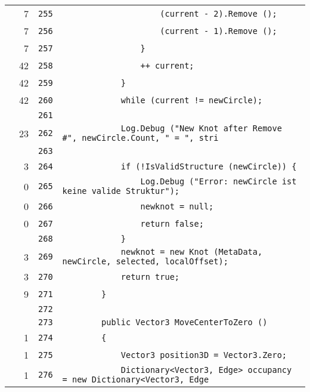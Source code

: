 \documentclass[a4paper,10pt]{article}
\begin{document}
\begin{longtable}[l]{lrrl}
\cellcolor{green} & 7 & \verb~255~ & \verb~                    (current - 2).Remove ();~\\
\cellcolor{green} & 7 & \verb~256~ & \verb~                    (current - 1).Remove ();~\\
\cellcolor{green} & 7 & \verb~257~ & \verb~                }~\\
\cellcolor{green} & 42 & \verb~258~ & \verb~                ++ current;~\\
\cellcolor{green} & 42 & \verb~259~ & \verb~            }~\\
\cellcolor{green} & 42 & \verb~260~ & \verb~            while (current != newCircle);~\\
\cellcolor{gray} &  & \verb~261~ & \verb~~\\
\cellcolor{green} & 23 & \verb~262~ & \verb~            Log.Debug ("New Knot after Remove #", newCircle.Count, " = ", stri~\\
\cellcolor{gray} &  & \verb~263~ & \verb~~\\
\cellcolor{green} & 3 & \verb~264~ & \verb~            if (!IsValidStructure (newCircle)) {~\\
\cellcolor{red} & 0 & \verb~265~ & \verb~                Log.Debug ("Error: newCircle ist keine valide Struktur");~\\
\cellcolor{red} & 0 & \verb~266~ & \verb~                newknot = null;~\\
\cellcolor{red} & 0 & \verb~267~ & \verb~                return false;~\\
\cellcolor{gray} &  & \verb~268~ & \verb~            }~\\
\cellcolor{green} & 3 & \verb~269~ & \verb~            newknot = new Knot (MetaData, newCircle, selected, localOffset);~\\
\cellcolor{green} & 3 & \verb~270~ & \verb~            return true;~\\
\cellcolor{green} & 9 & \verb~271~ & \verb~        }~\\
\cellcolor{gray} &  & \verb~272~ & \verb~~\\
\cellcolor{gray} &  & \verb~273~ & \verb~        public Vector3 MoveCenterToZero ()~\\
\cellcolor{green} & 1 & \verb~274~ & \verb~        {~\\
\cellcolor{green} & 1 & \verb~275~ & \verb~            Vector3 position3D = Vector3.Zero;~\\
\cellcolor{green} & 1 & \verb~276~ & \verb~            Dictionary<Vector3, Edge> occupancy = new Dictionary<Vector3, Edge~\\

\end{longtable}
\end{document}

